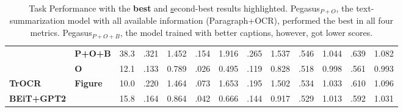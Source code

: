 \begin{table}[]
\begin{tabular}{@{}llccccccccccc@{}}
 & \textbf{P+O+B} & 38.3 & .321 & 1.452 & .154 & 1.916 & .265 & 1.537 & .546 & 1.044 & .639 & 1.082 \\
 & \textbf{O} & 12.1 & .133 & 0.789 & .026 & 0.495 & .119 & 0.828 & .518 & 0.998 & .561 & 0.993 \\ \midrule
\textbf{TrOCR} & \multirow{2}{*}{\textbf{Figure}} & 10.0 & .220 & 1.464 & .073 & 1.653 & .195 & 1.502 & .534 & 1.033 & .610 & 1.096 \\
\textbf{BEiT+GPT2} &  & 15.8 & .164 & 0.864 & .042 & 0.666 & .144 & 0.917 & .529 & 1.013 & .592 & 1.031 \\
\bottomrule
\end{tabular}
\addtolength{\tabcolsep}{+1.0mm}
\caption{Task Performance with the \textbf{best} and {\ul second-best} results highlighted. Pegasus$_{P+O}$, the text-summarization model with all available information (Paragraph+OCR), performed the best in all four metrics. Pegasus$_{P+O+B}$, the model trained with better captions, however, got lower scores.}
\label{tab:result-summarization}
\vspace{-3mm}
\end{table}


